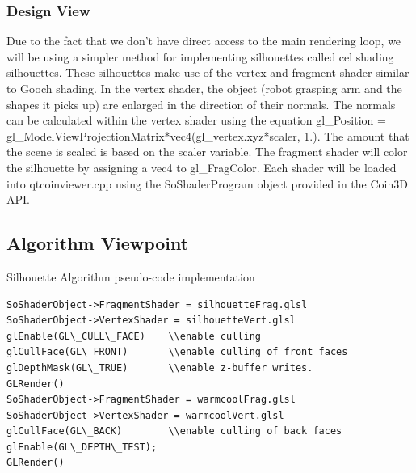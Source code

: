 ﻿\documentclass[10pt,journal,compsoc,draftclsnofoot]{IEEEtran}
\begin{document}
\begin{flushleft}
\subsubsection{Design View}
Due to the fact that we don't have direct access to the main rendering loop, we will be using a simpler method for implementing silhouettes called cel shading silhouettes.
These silhouettes make use of the vertex and fragment shader similar to Gooch shading.
In the vertex shader, the object (robot grasping arm and the shapes it picks up) are enlarged in the direction of their normals.
The normals can be calculated within the vertex shader using the equation gl\_Position = gl\_ModelViewProjectionMatrix*vec4(gl\_vertex.xyz*scaler, 1.).
The amount that the scene is scaled is based on the scaler variable.
The fragment shader will color the silhouette by assigning a vec4 to gl\_FragColor.
Each shader will be loaded into qtcoinviewer.cpp using the SoShaderProgram object provided in the Coin3D API.
\newpage

\subsection{Algorithm Viewpoint}
Silhouette Algorithm pseudo-code implementation

\begin{lstlisting}
SoShaderObject->FragmentShader = silhouetteFrag.glsl
SoShaderObject->VertexShader = silhouetteVert.glsl
glEnable(GL\_CULL\_FACE)	\\enable culling
glCullFace(GL\_FRONT)		\\enable culling of front faces
glDepthMask(GL\_TRUE)		\\enable z-buffer writes.
GLRender()
SoShaderObject->FragmentShader = warmcoolFrag.glsl
SoShaderObject->VertexShader = warmcoolVert.glsl
glCullFace(GL\_BACK)		\\enable culling of back faces
glEnable(GL\_DEPTH\_TEST);
GLRender()
\end{lstlisting}


\end{flushleft}
\end{document}
